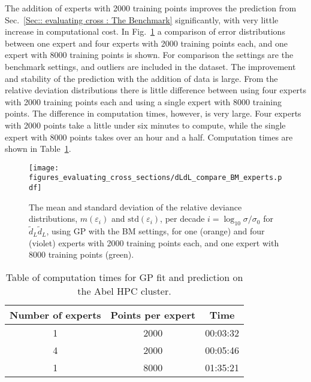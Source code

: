 \documentclass[twoside,english]{uiofysmaster}
\begin{document}
{The addition of experts with 2000 training points improves the prediction from Sec.~\ref{Sec:: evaluating cross : The Benchmark} significantly, with very little increase in computational cost. In Fig.~\ref{Fig:: evaluating cross : compare 1 vs 4 expert dLdL} a comparison of error distributions between one expert and four experts with 2000 training points each, and one expert with 8000 training points is shown.  For comparison the settings are the benchmark settings, and outliers are included in the dataset. The improvement and stability of the prediction with the addition of data is large. From the relative deviation distributions there is little difference between using four experts with 2000 training points each and using a single expert with 8000 training points. The difference in computation times, however, is very large. Four experts with 2000 points take a little under six minutes to compute, while the single expert with 8000 points takes over an hour and a half. Computation times are shown in Table~\ref{Tab:: evaluating cross : computation times experts BM}.

\begin{figure}
\centering
\texttt{[image: figures\_evaluating\_cross\_sections/dLdL\_compare\_BM\_experts.pdf]}
\caption{The mean and standard deviation of the relative deviance distributions, $m(\varepsilon_i)$ and $\mathrm{std}(\varepsilon_i)$, per decade $i = \log_{10} \sigma / \sigma_0$ for $\widetilde{d}_L \widetilde{d}_L$, using GP with the BM settings, for one (orange) and four (violet) experts with 2000 training points each, and one expert with 8000 training points (green).}
\label{Fig:: evaluating cross : compare 1 vs 4 expert dLdL}
\end{figure}  

\begin{table}
\centering
\begin{tabular}{@{}ccc@{}} \toprule
Number of experts & Points per expert & Time\\
\midrule
1 & 2000 & 00:03:32\\
4 & 2000 & 00:05:46\\
1 & 8000 & 01:35:21\\ \bottomrule
\end{tabular}
\caption{Table of computation times for GP fit and prediction on the Abel HPC cluster.}
\label{Tab:: evaluating cross : computation times experts BM}
\end{table}


}
\end{document}
